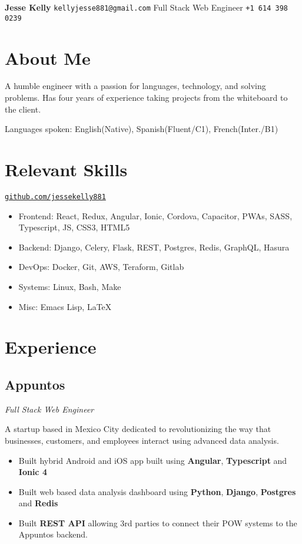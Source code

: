 \documentclass[letterpaper,11pt]{article}
\begin{document}
\begin{flushleft}
\Large{\textbf{Jesse Kelly}}
\hfill
\texttt{kellyjesse881@gmail.com}
\newline
Full Stack Web Engineer
\hfill
\texttt{+1 614 398 0239}
\end{flushleft}

\section{About Me}
A humble engineer with a passion for languages, technology, and solving problems.
Has four years of experience taking projects from the whiteboard to the client.

\vspace{2mm}
Languages spoken: English(Native), Spanish(Fluent/C1), French(Inter./B1)

\section{Relevant Skills}
\href{https://github.com/jessekelly881}{\texttt{github.com/jessekelly881}}
\begin{itemize}
\setlength\itemsep{0em}
\item Frontend: React, Redux, Angular, Ionic, Cordova, Capacitor, PWAs, SASS, Typescript, JS, CSS3, HTML5
\item Backend: Django, Celery, Flask, REST, Postgres, Redis, GraphQL, Hasura
\item DevOps: Docker, Git, AWS, Teraform, Gitlab
\item Systems: Linux, Bash, Make
\item Misc: Emacs Lisp, \LaTeX
\end{itemize}

\section{Experience}
\subsection{Appuntos}
\textit{Full Stack Web Engineer}
\vspace{2mm}
\begin{adjustwidth}{1cm}{1cm}
  A startup based in Mexico City dedicated to revolutionizing the way that businesses, customers,
  and employees interact using advanced data analysis.

\begin{itemize}
\item Built hybrid Android and iOS app built using \textbf{Angular}, \textbf{Typescript} and \textbf{Ionic 4}
\item Built web based data analysis dashboard using \textbf{Python}, \textbf{Django}, \textbf{Postgres} and \textbf{Redis}
\item Built \textbf{REST API} allowing 3rd parties to connect their POW systems to the Appuntos backend.
\end{itemize}

\end{adjustwidth}
\end{document}
